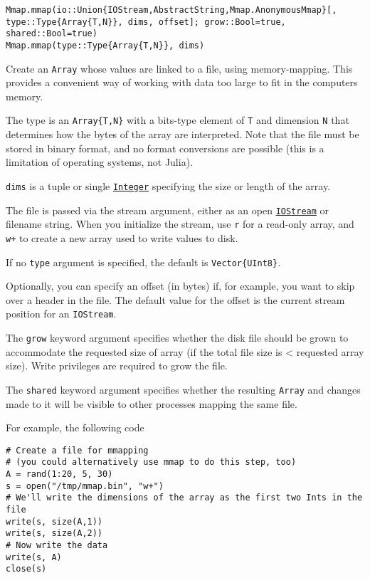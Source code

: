\begin{adjustwidth}{2em}{0pt}


\begin{verbatim}
Mmap.mmap(io::Union{IOStream,AbstractString,Mmap.AnonymousMmap}[, type::Type{Array{T,N}}, dims, offset]; grow::Bool=true, shared::Bool=true)
Mmap.mmap(type::Type{Array{T,N}}, dims)
\end{verbatim}

Create an \texttt{Array} whose values are linked to a file, using memory-mapping. This provides a convenient way of working with data too large to fit in the computer{\textquotesingle}s memory.

The type is an \texttt{Array\{T,N\}} with a bits-type element of \texttt{T} and dimension \texttt{N} that determines how the bytes of the array are interpreted. Note that the file must be stored in binary format, and no format conversions are possible (this is a limitation of operating systems, not Julia).

\texttt{dims} is a tuple or single \hyperlink{8469131683393450448}{\texttt{Integer}} specifying the size or length of the array.

The file is passed via the stream argument, either as an open \hyperlink{12496894737220238417}{\texttt{IOStream}} or filename string. When you initialize the stream, use \texttt{{\textquotedbl}r{\textquotedbl}} for a {\textquotedbl}read-only{\textquotedbl} array, and \texttt{{\textquotedbl}w+{\textquotedbl}} to create a new array used to write values to disk.

If no \texttt{type} argument is specified, the default is \texttt{Vector\{UInt8\}}.

Optionally, you can specify an offset (in bytes) if, for example, you want to skip over a header in the file. The default value for the offset is the current stream position for an \texttt{IOStream}.

The \texttt{grow} keyword argument specifies whether the disk file should be grown to accommodate the requested size of array (if the total file size is < requested array size). Write privileges are required to grow the file.

The \texttt{shared} keyword argument specifies whether the resulting \texttt{Array} and changes made to it will be visible to other processes mapping the same file.

For example, the following code


\begin{verbatim}
# Create a file for mmapping
# (you could alternatively use mmap to do this step, too)
A = rand(1:20, 5, 30)
s = open("/tmp/mmap.bin", "w+")
# We'll write the dimensions of the array as the first two Ints in the file
write(s, size(A,1))
write(s, size(A,2))
# Now write the data
write(s, A)
close(s)


\end{verbatim}
\end{adjustwidth}
